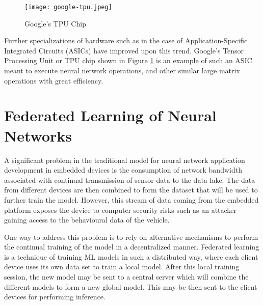 \begin{figure}[h]
	\centering
	\texttt{[image: google-tpu.jpeg]}
	\caption{Google's TPU Chip}
	\label{fig:google-tpu}
\end{figure}

Further specializations of hardware such as in the case of Application-Specific Integrated Circuits (ASICs) have improved upon this trend. Google's Tensor Processing Unit or TPU chip shown in Figure \ref{fig:google-tpu} is an example of such an ASIC meant to execute neural network operations, and other similar large matrix operations with great efficiency.

\section{Federated Learning of Neural Networks}

A significant problem in the traditional model for neural network application development in embedded devices is the consumption of network bandwidth associated with continual transmission of sensor data to the data lake. The data from different devices are then combined to form the dataset that will be used to further train the model. However, this stream of data coming from the embedded platform exposes the device to computer security risks such as an attacker gaining access to the behavioural data of the vehicle.

\begin{figure}[h]
	\centering
\end{figure}

One way to address this problem is to rely on alternative mechanisms to perform the continual training of the model in a decentralized manner. Federated learning is a technique of training ML models in such a distributed way, where each client device uses its own data set to train a local model. After this local training session, the new model may be sent to a central server which will combine the different models to form a new global model. This may be then sent to the client devices for performing inference.

